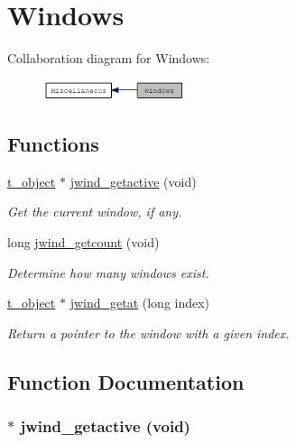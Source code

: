 \hypertarget{group__jwind}{
\section{Windows}
\label{group__jwind}
}


Collaboration diagram for Windows:\nopagebreak
\begin{figure}[H]
\begin{center}
\leavevmode
\includegraphics[width=118pt]{group__jwind}
\end{center}
\end{figure}
\subsection*{Functions}
\begin{DoxyCompactItemize}
\item 
\hyperlink{structt__object}{t\_\-object} $\ast$ \hyperlink{group__jwind_ga607f8f4486ff1588ff47c17df61f8af1}{jwind\_\-getactive} (void)
\begin{DoxyCompactList}\small\item\em Get the current window, if any. \item\end{DoxyCompactList}\item 
long \hyperlink{group__jwind_gae627d232548eaefbe00a94ff3c5a1cb6}{jwind\_\-getcount} (void)
\begin{DoxyCompactList}\small\item\em Determine how many windows exist. \item\end{DoxyCompactList}\item 
\hyperlink{structt__object}{t\_\-object} $\ast$ \hyperlink{group__jwind_ga6a7b4f369dfdd3e17e9509cec7bdbb64}{jwind\_\-getat} (long index)
\begin{DoxyCompactList}\small\item\em Return a pointer to the window with a given index. \item\end{DoxyCompactList}\end{DoxyCompactItemize}


\subsection{Function Documentation}
\hypertarget{group__jwind_ga607f8f4486ff1588ff47c17df61f8af1}{
\subsubsection[{jwind\_\-getactive}]{$\ast$ jwind\_\-getactive (void)}}
\label{group__jwind_ga607f8f4486ff1588ff47c17df61f8af1}


